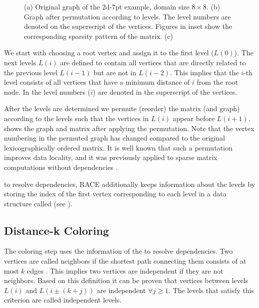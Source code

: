 \begin{figure}[tb]
{\begin{picture}
		\end{picture}
	}
	\caption{\label{fig:level_construction}(a) Original graph of the 2d-7pt example, domain size $8 \times 8$. (b) Graph after permutation according to levels. The level numbers are denoted on the superscript of the vertices. Figures in inset show the corresponding sparsity pattern of the matrix. (c) \levelPtr}
\end{figure}
We start with choosing a root vertex and assign it to the first level ($L(0)$). 
The next levels $L(i)$ are defined to contain all vertices that are directly related to the previous
level $L(i-1)$ but are not in $L(i-2)$. This implies that the $i$-th level consists of all vertices
that have a minimum distance of $i$ from the root node. In  the
level numbers ($i$) are denoted in the superscript of the vertices. 

After the levels are determined we permute (reorder) the matrix (and graph) according
to the levels such that the vertices in $L(i)$ appear before $L(i+1)$.  
shows the graph and matrix after applying the permutation. Note that the vertex numbering 
in the permuted graph has changed compared to the original lexicographically ordered
matrix.
It is well known  that such a permutation improves data locality,
and it was previously applied to sparse matrix
computations without dependencies \cite{RCM_Sparse_computation}.

\Inorder to resolve dependencies, \acrshort{RACE} additionally keeps information
about the levels by storing the index of the first vertex corresponding
to each level in a data structure called \levelPtr (see ).

\subsection{Distance-k Coloring}
The \DK coloring step uses the information of the \levelPtr to resolve
dependencies. Two vertices are called \DK neighbors if the shortest path connecting 
them consists of at most $k$ edges \cite{dist_k_def}. This implies two vertices
 are \DK independent if they are not \DK neighbors. Based on this definition
 it can be proven that vertices between levels $L(i)$ and $L(i \pm (k+j))$ are
 \DK independent $\forall j\ge1$. The levels that satisfy this criterion
 are called \DK independent levels.
 
